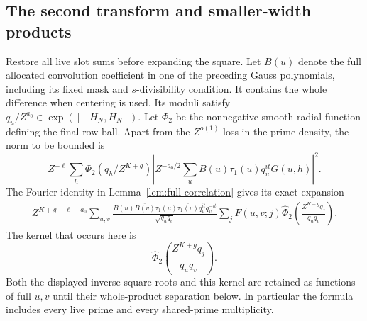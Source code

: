 \documentclass[12pt]{article}
\begin{document}
\subsection{The second transform and smaller-width products}\label{sec:plain-second-transform}

Restore all live slot sums before expanding the square.  Let
\(B(u)\) denote the full allocated convolution coefficient in
one of the preceding Gauss polynomials, including its fixed mask
and \(s\)-divisibility condition.  It contains the whole difference
when centering is used.  Its moduli satisfy
\(q_u/Z^{a_0}\in\exp([-H_N,H_N])\).  Let \(\Phi_2\) be the nonnegative
smooth radial function defining the final row ball.  Apart from
the \(Z^{o(1)}\) loss in the prime density, the norm to be bounded is
\[
 Z^{-\ell}\sum_h\Phi_2(q_h/Z^{K+g})
 \left|Z^{-a_0/2}\sum_u B(u)\tau_1(u)q_u^{it}G(u,h)\right|^2.
\]
The Fourier identity in Lemma~\ref{lem:full-correlation} gives its
exact expansion
\[
 \begin{split}
 Z^{K+g-\ell-a_0}\sum_{u,v}
 \frac{B(u)\overline{B(v)}\tau_1(u)\overline{\tau_1(v)}
       q_u^{it}q_v^{-it}}{\sqrt{q_uq_v}}
 \sum_j F(u,v;j)
 \widehat\Phi_2\left(\frac{Z^{K+g}q_j}{q_uq_v}\right).
 \end{split}
\]
The kernel that occurs here is
\begin{equation}
 \widehat\Phi_2\left(\frac{Z^{K+g}q_j}{q_uq_v}\right).
 \label{old-eq:2.18b}
\end{equation}
Both the displayed inverse square roots and this kernel are retained
as functions of full \(u,v\) until their whole-product separation below.  In particular the
formula includes every live prime and every shared-prime multiplicity.
\end{document}
